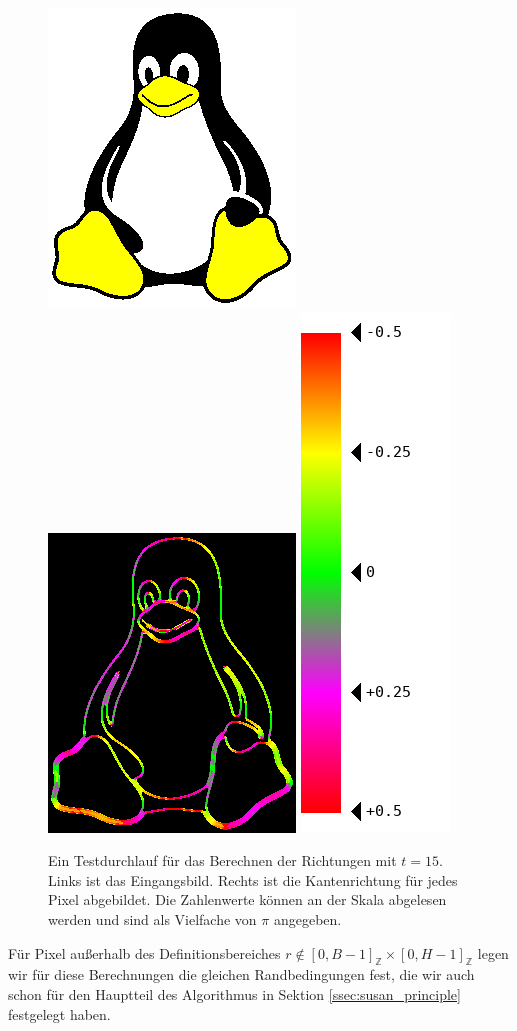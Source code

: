 \documentclass[a4paper, 11pt]{report}
\theoremstyle{definition}
\begin{document}
			\begin{figure}[H]\centering
				\includegraphics[width=.4\textwidth]{../examples/tux/tux.png}\quad
				\includegraphics[width=.4\textwidth]{../examples/tux/15_out_heat.png}\quad
				\includegraphics[width=.14\textwidth]{assets/heatmap-strip/strip.png}
				\caption{Ein Testdurchlauf für das Berechnen der Richtungen mit $t=15$. Links ist das Eingangsbild. Rechts ist die Kantenrichtung für jedes Pixel abgebildet. Die Zahlenwerte können an der Skala abgelesen werden und sind als Vielfache von $\pi$ angegeben.}
				\label{fig:directions_test}
			\end{figure}

			Für Pixel außerhalb des Definitionsbereiches $r \notin [0, B-1]_\mathbb{Z} \times [0, H-1]_\mathbb{Z}$ legen wir für diese Berechnungen die gleichen Randbedingungen fest, die wir auch schon für den Hauptteil des Algorithmus in Sektion \ref{ssec:susan_principle} festgelegt haben.
\end{document}
